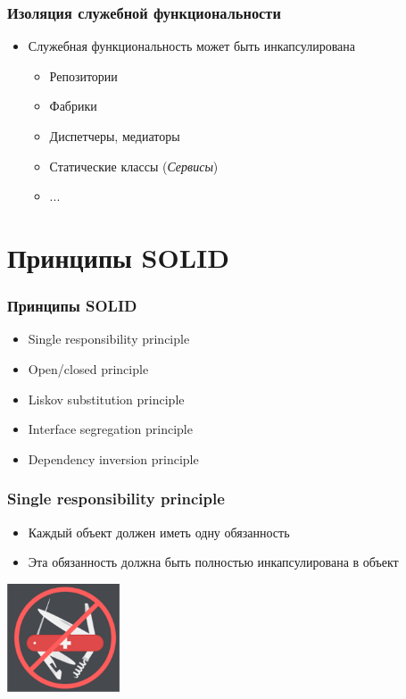 \documentclass[xetex,mathserif,serif]{beamer}
\begin{document}
	\begin{frame}
		\frametitle{Изоляция служебной функциональности}
		\begin{itemize}
			\item Служебная функциональность может быть инкапсулирована
			\begin{itemize}
				\item Репозитории
				\item Фабрики
				\item Диспетчеры, медиаторы
				\item Статические классы (\textit{Сервисы})
				\item ...
			\end{itemize}
		\end{itemize}
	\end{frame}

	\section{Принципы SOLID}
	
	\begin{frame}
		\frametitle{Принципы SOLID}
		\begin{itemize}
			\item Single responsibility principle
			\item Open/closed principle
			\item Liskov substitution principle
			\item Interface segregation principle
			\item Dependency inversion principle
		\end{itemize}
	\end{frame}

	\begin{frame}
		\frametitle{Single responsibility principle}
		\begin{itemize}
			\item Каждый объект должен иметь одну обязанность
			\item Эта обязанность должна быть полностью инкапсулирована в объект
		\end{itemize}
		\begin{flushright}
			\includegraphics[width=0.25\textwidth]{singleResponsibility.png}
		\end{flushright}
	\end{frame}
\end{document}
